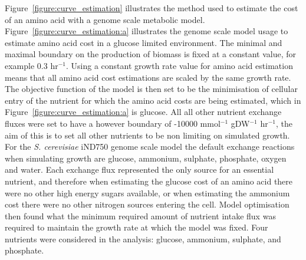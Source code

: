 Figure~\vref{figure:curve_estimation} illustrates the method used to estimate the cost of an amino acid with a genome scale metabolic model. Figure~\ref{figure:curve_estimation:a} illustrates the genome scale model usage to estimate amino acid cost in a glucose limited environment. The minimal and maximal boundary on the production of biomass is fixed at a constant value, for example 0.3 hr$^{-1}$. Using a constant growth rate value for amino acid estimation means that all amino acid cost estimations are scaled by the same growth rate. The objective function of the model is then set to be the minimisation of cellular entry of the nutrient for which the amino acid costs are being estimated, which in Figure~\ref{figure:curve_estimation:a} is glucose. All all other nutrient exchange fluxes were set to have a however boundary of -10000 mmol$^{-1}$ gDW$^{-1}$ hr$^{-1}$, the aim of this is to set all other nutrients to be non limiting on simulated growth. For the \emph{S. cerevisiae} iND750 \cite{duarte2004a} genome scale model the default exchange reactions when simulating growth are glucose, ammonium, sulphate, phosphate, oxygen and water. Each exchange flux represented the only source for an essential nutrient, and therefore when estimating the glucose cost of an amino acid there were no other high energy sugars available, or when estimating the ammonium cost there were no other nitrogen sources entering the cell. Model optimisation then found what the minimum required amount of nutrient intake flux was required to maintain the growth rate at which the model was fixed. Four nutrients were considered in the analysis: glucose, ammonium, sulphate, and phosphate. 

